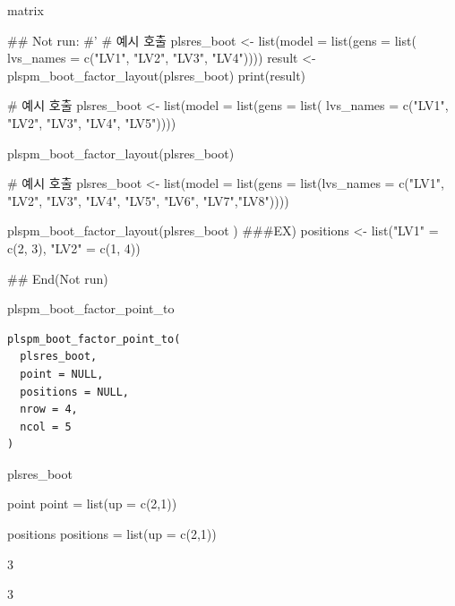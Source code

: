 \documentclass[a4paper]{book}
\begin{document}
%
\begin{Value}
matrix
\end{Value}
%
\begin{Examples}
\begin{ExampleCode}

## Not run: 
#'
# 예시 호출
plsres_boot <- list(model = list(gens = list(
                  lvs_names = c("LV1", "LV2", "LV3", "LV4"))))
result <- plspm_boot_factor_layout(plsres_boot)
print(result)

# 예시 호출
plsres_boot <- list(model =
list(gens = list(
lvs_names = c("LV1", "LV2", "LV3", "LV4", "LV5"))))

plspm_boot_factor_layout(plsres_boot)

# 예시 호출
plsres_boot <- list(model = list(gens =
list(lvs_names = c("LV1", "LV2", "LV3",
"LV4", "LV5", "LV6", "LV7","LV8"))))


plspm_boot_factor_layout(plsres_boot )
###EX)
positions <- list("LV1" = c(2, 3), "LV2" = c(1, 4))


## End(Not run)


\end{ExampleCode}
\end{Examples}
%
\begin{Description}
plspm\_boot\_factor\_point\_to
\end{Description}
%
\begin{Usage}
\begin{verbatim}
plspm_boot_factor_point_to(
  plsres_boot,
  point = NULL,
  positions = NULL,
  nrow = 4,
  ncol = 5
)
\end{verbatim}
\end{Usage}
%
\begin{Arguments}
\begin{ldescription}
\item[\code{plsres\_boot}] plsres\_boot

\item[\code{point}] point point = list(up = c(2,1))

\item[\code{positions}] positions positions = list(up = c(2,1))

\item[\code{nrow}] 3

\item[\code{ncol}] 3
\end{ldescription}
\end{Arguments}
\end{document}
